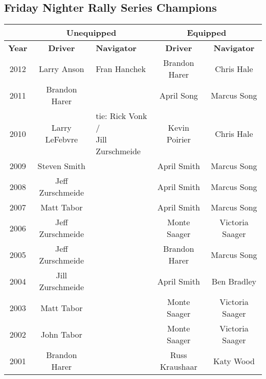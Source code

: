 \subsection{Friday Nighter Rally Series Champions}
{
\scriptsize
\begin{tabular}{|c|c|p{3cm}|c|c|}
\hline
 & \multicolumn{2}{|c|}{Unequipped} & \multicolumn{2}{|c|}{Equipped} \\
\hline
\textbf{Year} & \textbf{Driver} & \textbf{Navigator} & \textbf{Driver} & \textbf{Navigator} \\
\hline
2012 & Larry Anson & Fran Hanchek & Brandon Harer & Chris Hale \\
\hline
2011 & Brandon Harer & \centering{Markus Gattman} & April Song & Marcus Song \\
\hline
2010 & Larry LeFebvre & \centering{tie: Rick Vonk /\newline Jill Zurschmeide} & Kevin Poirier & Chris Hale \\
\hline
2009 & Steven Smith & \centering{John Masterman} & April Smith & Marcus Song \\
\hline
2008 & Jeff Zurschmeide & \centering{Jill Zurschmeide} & April Smith & Marcus Song \\
\hline
2007 & Matt Tabor & \centering{Marcus Gattman} & April Smith & Marcus Song \\
\hline
2006 & Jeff Zurschmeide & \centering{Jill Zurschmeide} & Monte Saager & Victoria Saager \\
\hline
2005 & Jeff Zurschmeide & \centering{Jill Zurschmeide} & Brandon Harer & Marcus Song \\
\hline
2004 & Jill Zurschmeide & \centering{Jeff Zurschmeide} & April Smith & Ben Bradley \\
\hline
2003 & Matt Tabor & \centering{Marcus Gattman} & Monte Saager & Victoria Saager \\
\hline
2002 & John Tabor & \centering{Darlene Tabor} & Monte Saager & Victoria Saager \\
\hline
2001 & Brandon Harer & \centering{Jennifer McGrew} & Russ Kraushaar & Katy Wood \\
\hline
\end{tabular}
}